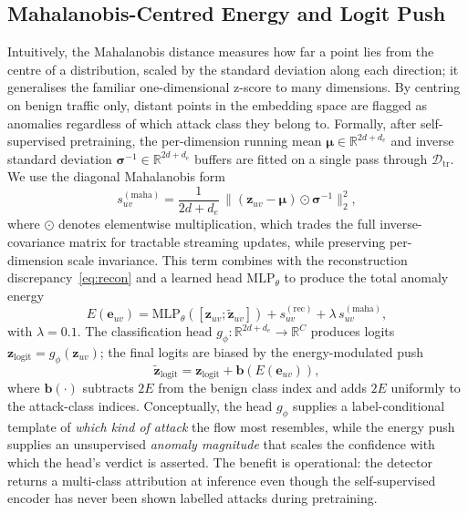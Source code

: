 \documentclass{ieeeaccess}
\begin{document}
\subsection{Mahalanobis-Centred Energy and Logit Push}
\label{sec:method:energy}
Intuitively, the Mahalanobis distance measures how far a point lies from
the centre of a distribution, scaled by the standard deviation along each
direction; it generalises the familiar one-dimensional z-score to many
dimensions. By centring on benign traffic only, distant points in the
embedding space are flagged as anomalies regardless of which attack class
they belong to. Formally, after self-supervised pretraining, the
per-dimension running mean $\bm{\mu} \in \mathbb{R}^{2d+d_e}$ and inverse
standard deviation $\bm{\sigma}^{-1} \in \mathbb{R}^{2d+d_e}$ buffers are
fitted on a single pass through $\mathcal{D}_\text{tr}$. We use the
diagonal Mahalanobis form
\begin{equation}
s_{uv}^{(\mathrm{maha})} = \frac{1}{2d+d_e}\,\|(\mathbf{z}_{uv} - \bm{\mu}) \odot \bm{\sigma}^{-1}\|_2^2,
\label{eq:maha}
\end{equation}
where $\odot$ denotes elementwise multiplication, which trades the full
inverse-covariance matrix for tractable streaming updates, while
preserving per-dimension scale invariance. This term combines with the
reconstruction discrepancy~\eqref{eq:recon} and a learned head
$\mathrm{MLP}_\theta$ to produce the total anomaly energy
\begin{equation}
E(\mathbf{e}_{uv}) = \mathrm{MLP}_\theta([\mathbf{z}_{uv}; \tilde{\mathbf{z}}_{uv}]) + s_{uv}^{(\mathrm{rec})} + \lambda\,s_{uv}^{(\mathrm{maha})},
\label{eq:energy}
\end{equation}
with $\lambda = 0.1$. The classification head $g_\phi: \mathbb{R}^{2d+d_e}
\to \mathbb{R}^{C}$ produces logits $\mathbf{z}_{\mathrm{logit}} =
g_\phi(\mathbf{z}_{uv})$; the final logits are biased by the
energy-modulated push
\begin{equation}
\tilde{\mathbf{z}}_{\mathrm{logit}} = \mathbf{z}_{\mathrm{logit}} + \mathbf{b}(E(\mathbf{e}_{uv})),
\end{equation}
where $\mathbf{b}(\cdot)$ subtracts $2E$ from the benign class index and
adds $2E$ uniformly to the attack-class indices. Conceptually, the head
$g_\phi$ supplies a label-conditional template of \emph{which kind of
attack} the flow most resembles, while the energy push supplies an
unsupervised \emph{anomaly magnitude} that scales the confidence with
which the head's verdict is asserted. The benefit is operational: the
detector returns a multi-class attribution at inference even though the
self-supervised encoder has never been shown labelled attacks during
pretraining.
\end{document}
